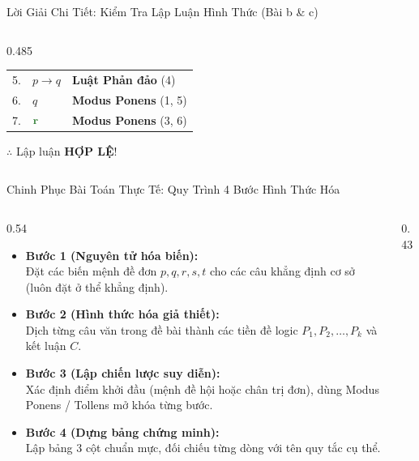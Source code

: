 \documentclass[aspectratio=169, 10pt]{beamer}
\begin{document}
\begin{frame}{Lời Giải Chi Tiết: Kiểm Tra Lập Luận Hình Thức (Bài b \& c)}
\begin{columns}[t, onlytextwidth]
\begin{column}{0.485\textwidth}
\begin{cozyExample}
\begin{tabular}{cll}
          5. & $p \to q$ & \textbf{Luật Phản đảo} (4) \\
          6. & $q$ & \textbf{Modus Ponens} (1, 5) \\
          7. & $\mathbf{\textcolor{cozyTrue}{r}}$ & \textbf{Modus Ponens} (3, 6) \\
          \bottomrule
        \end{tabular}
        \par\vspace{0.05cm}
        \centering\footnotesize\color{cozyTrue}$\therefore$ Lập luận \textbf{HỢP LỆ}!
      \end{cozyExample}
    \end{column}
  \end{columns}
\end{frame}

\begin{frame}{Chinh Phục Bài Toán Thực Tế: Quy Trình 4 Bước Hình Thức Hóa}
  \begin{columns}[t, onlytextwidth]
    \begin{column}{0.54\textwidth}
      \begin{cozyMethod}
        \small
        \begin{itemize}
          \setlength{\itemsep}{0.8pt}
          \item \textbf{Bước 1 (Nguyên tử hóa biến):}\\
          Đặt các biến mệnh đề đơn $p, q, r, s, t$ cho các câu khẳng định cơ sở (luôn đặt ở thể khẳng định).
          \item \textbf{Bước 2 (Hình thức hóa giả thiết):}\\
          Dịch từng câu văn trong đề bài thành các tiền đề logic $P_1, P_2, \dots, P_k$ và kết luận $C$.
          \item \textbf{Bước 3 (Lập chiến lược suy diễn):}\\
          Xác định điểm khởi đầu (mệnh đề hội hoặc chân trị đơn), dùng Modus Ponens / Tollens mở khóa từng bước.
          \item \textbf{Bước 4 (Dựng bảng chứng minh):}\\
          Lập bảng 3 cột chuẩn mực, đối chiếu từng dòng với tên quy tắc cụ thể.
        \end{itemize}
      \end{cozyMethod}
    \end{column}
    \begin{column}{0.43\textwidth}
      \begin{cozyTrap}

\end{cozyTrap}
\end{column}
\end{columns}
\end{frame}
\end{document}
